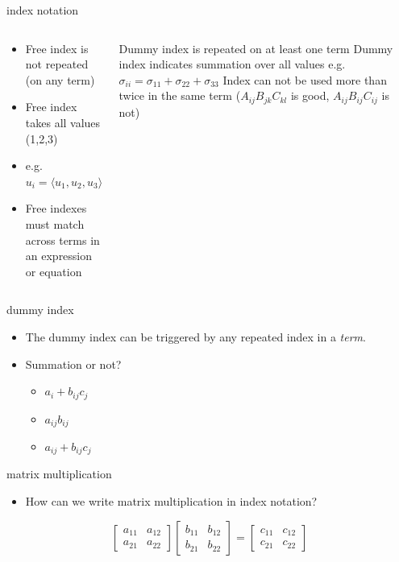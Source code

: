 \documentclass[
  letterpaper,
  ignorenonframetext,
  aspectratio=43,
  handout,
  12pt]{beamer}
\providecommand{\tightlist}{%
  \setlength{\itemsep}{0pt}\setlength{\parskip}{0pt}}
\providecommand{\tightlist}{%
\setlength{\itemsep}{0pt}\setlength{\parskip}{0pt}}
\begin{document}
\begin{frame}{index notation}
\protect\hypertarget{index-notation-2}{}
\begin{columns}[T]
\begin{column}{0.5\textwidth}
\begin{itemize}
\tightlist
\item
  Free index is not repeated (on any term)
\item
  Free index takes all values (1,2,3)
\item
  e.g.~\(u_i = \langle u_1, u_2, u_3 \rangle\)
\item
  Free indexes must match across terms in an expression or equation
\end{itemize}
\end{column}

\begin{column}{0.5\textwidth}
Dummy index is repeated on at least one term Dummy index indicates
summation over all values
e.g.~\(\sigma_{ii} = \sigma_{11} + \sigma_{22} + \sigma_{33}\) Index can
not be used more than twice in the same term (\(A_{ij}B_{jk}C_{kl}\) is
good, \(A_{ij}B_{ij}C_{ij}\) is not)
\end{column}
\end{columns}
\end{frame}

\begin{frame}{dummy index}
\protect\hypertarget{dummy-index-2}{}
\begin{itemize}
\tightlist
\item
  The dummy index can be triggered by any repeated index in a
  \emph{term}.
\item
  Summation or not?

  \begin{itemize}
  \tightlist
  \item
    \(a_i + b_{ij}c_j\)
  \item
    \(a_{ij}b_{ij}\)
  \item
    \(a_{ij} + b_{ij}c_j\)
  \end{itemize}
\end{itemize}
\end{frame}

\begin{frame}{matrix multiplication}
\protect\hypertarget{matrix-multiplication}{}
\begin{itemize}
\tightlist
\item
  How can we write matrix multiplication in index notation?
\end{itemize}

\[\begin{bmatrix}
    a_{11} & a_{12} \\
    a_{21} & a_{22}
  \end{bmatrix}
  \begin{bmatrix}
    b_{11} & b_{12} \\
    b_{21} & b_{22}
  \end{bmatrix} =
  \begin{bmatrix}
    c_{11} & c_{12} \\
    c_{21} & c_{22}
  \end{bmatrix}\]
\end{frame}
\end{document}
